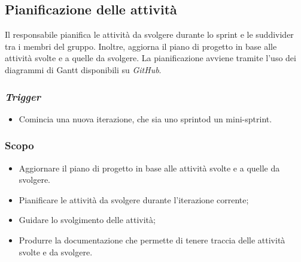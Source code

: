 \subsection{Pianificazione delle attività}
\label{pianificazione-attivia}

Il responsabile pianifica le attività da svolgere durante lo sprint
e le suddivider tra i membri del gruppo. Inoltre, aggiorna il piano di progetto
in base alle attività svolte e a quelle da svolgere. La pianificazione avviene
tramite l'uso dei diagrammi di Gantt disponibili su \textit{GitHub\g}.

\subsubsection{\textit{Trigger}}
\begin{itemize}
	\item Comincia una nuova iterazione, che sia uno sprint\g od un
	      mini-sptrint\g.
\end{itemize}

\subsubsection{Scopo}
\begin{itemize}
	\item Aggiornare il piano di progetto in base alle attività svolte e a
	      quelle da svolgere.

	\item Pianificare le attività da svolgere durante l'iterazione corrente;

	\item Guidare lo svolgimento delle attività;

	\item Produrre la documentazione che permette di tenere traccia delle
	      attività svolte e da svolgere.
\end{itemize}

